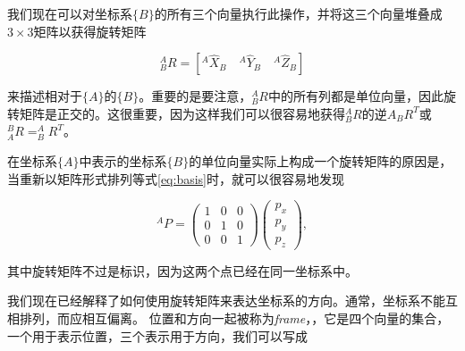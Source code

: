 我们现在可以对坐标系$\{B\}$的所有三个向量执行此操作，并将这三个向量堆叠成$3\times3$矩阵以获得旋转矩阵

%
\begin{equation}
^A_BR=[^A\hat{X}_B \quad ^A\hat{Y}_B \quad ^A\hat{Z}_B]
\end{equation}
%

来描述相对于$\{A\}$的$\{B\}$。重要的是要注意，$^A_BR$中的所有列都是单位向量，因此旋转矩阵是正交的。这很重要，因为这样我们可以很容易地获得$^A_BR$的逆$A_BR^T$或$^B_AR=^A_BR^T$。


在坐标系$\{A\}$中表示的坐标系$\{B\}$的单位向量实际上构成一个旋转矩阵的原因是，当重新以矩阵形式排列等式\ref{eq:basis}时，就可以很容易地发现

\begin{equation}
^AP=\left(\begin{array}{ccc}1 & 0 & 0\\0 & 1 & 0\\0 & 0 & 1\end{array}\right)\left(\begin{array}{c}p_x\\p_y\\p_z\end{array}\right),
\end{equation}


其中旋转矩阵不过是标识，因为这两个点已经在同一坐标系中。

%

我们现在已经解释了如何使用旋转矩阵来表达坐标系的方向。通常，坐标系不能互相排列，而应相互偏离。 位置和方向一起被称为\emph{frame}，，它是四个向量的集合，一个用于表示位置，三个表示用于方向，我们可以写成


